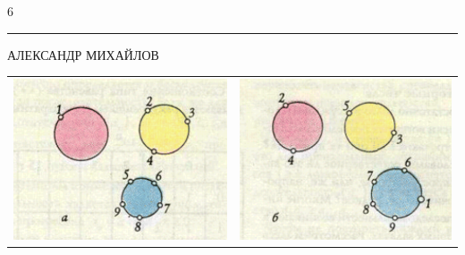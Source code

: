 \begin{center}
	\Large{6}
\end{center}

\vspace{-8mm}
\noindent\rule{\textwidth}{0,5pt}
\begin{center}
	\vspace{-3mm}
	\tiny{АЛЕКСАНДР МИХАЙЛОВ}
\end{center}

\begin{table}[h]
	\begin{tabular}{rl}
		
		\includegraphics{page1} & \includegraphics{page2} \\
		
	\end{tabular}
\end{table}

